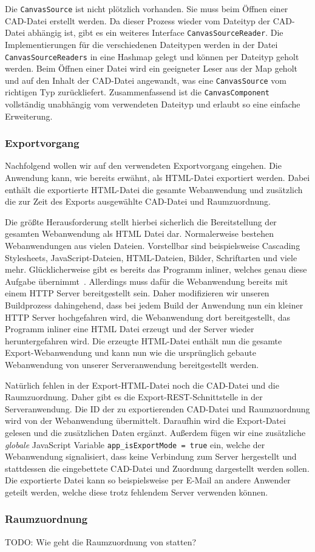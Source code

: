 Die \texttt{CanvasSource} ist nicht plötzlich vorhanden.
Sie muss beim Öffnen einer CAD-Datei erstellt werden.
Da dieser Prozess wieder vom Dateityp der CAD-Datei abhängig ist, gibt es ein weiteres Interface \texttt{CanvasSourceReader}.
Die Implementierungen für die verschiedenen Dateitypen werden in der Datei \texttt{CanvasSourceReaders} in eine Hashmap gelegt und können per Dateityp geholt werden.
Beim Öffnen einer Datei wird ein geeigneter \glqq{}Leser\grqq{} aus der Map geholt und auf den Inhalt der CAD-Datei angewandt, was eine \texttt{CanvasSource} vom richtigen Typ zurückliefert.
Zusammenfassend ist die \texttt{CanvasComponent} vollständig unabhängig vom verwendeten Dateityp und erlaubt so eine einfache Erweiterung.

\subsubsection{Exportvorgang}
\label{subsubsec:export-process}

Nachfolgend wollen wir auf den verwendeten Exportvorgang eingehen.
Die Anwendung kann, wie bereits erwähnt, als HTML-Datei exportiert werden.
Dabei enthält die exportierte HTML-Datei die gesamte Webanwendung und zusätzlich die zur Zeit des Exports ausgewählte CAD-Datei und Raumzuordnung.

Die größte Herausforderung stellt hierbei sicherlich die Bereitstellung der gesamten Webanwendung als HTML Datei dar.
Normalerweise bestehen Webanwendungen aus vielen Dateien.
Vorstellbar sind beispielsweise Cascading Stylesheets, JavaScript-Dateien, HTML-Dateien, Bilder, Schriftarten und viele mehr.
Glücklicherweise gibt es bereits das Programm \glqq{}inliner\grqq{}, welches genau diese Aufgabe übernimmt~\cite{Inliner}.
Allerdings muss dafür die Webanwendung bereits mit einem HTTP Server bereitgestellt sein.
Daher modifizieren wir unseren Buildprozess dahingehend, dass bei jedem Build der Anwendung nun ein kleiner HTTP Server hochgefahren wird, die Webanwendung dort bereitgestellt, das Programm \glqq{}inliner\grqq{} eine HTML Datei erzeugt und der Server wieder heruntergefahren wird.
Die erzeugte HTML-Datei enthält nun die gesamte Export-Webanwendung und kann nun wie die ursprünglich gebaute Webanwendung von unserer Serveranwendung bereitgestellt werden.

Natürlich fehlen in der Export-HTML-Datei noch die CAD-Datei und die Raumzuordnung.
Daher gibt es die Export-REST-Schnittstelle in der Serveranwendung.
Die ID der zu exportierenden CAD-Datei und Raumzuordnung wird von der Webanwendung übermittelt.
Daraufhin wird die Export-Datei gelesen und die zusätzlichen Daten ergänzt.
Außerdem fügen wir eine zusätzliche \textit{globale} JavaScript Variable \texttt{app\_isExportMode = true} ein, welche der Webanwendung signalisiert, dass keine Verbindung zum Server hergestellt und stattdessen die eingebettete CAD-Datei und Zuordnung dargestellt werden sollen.
Die exportierte Datei kann so beispielsweise per E-Mail an andere Anwender geteilt werden, welche diese trotz fehlendem Server verwenden können.

\subsubsection{Raumzuordnung}
\label{subsubsec:room-mapping}

TODO: Wie geht die Raumzuordnung von statten?
